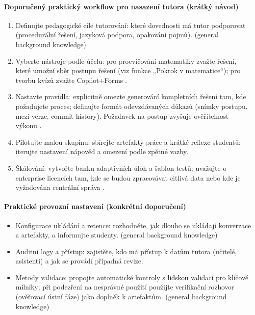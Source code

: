 \paragraph{Doporučený praktický workflow pro nasazení tutora (krátký návod)}
\begin{enumerate}
  \item Definujte pedagogické cíle tutorování: které dovednosti má tutor podporovat (procedurální řešení, jazyková podpora, opakování pojmů). (general background knowledge)
  \item Vyberte nástroje podle účelu: pro procvičování matematiky zvažte řešení, které umožní sběr postupu řešení (viz funkce „Pokrok v matematice“); pro tvorbu kvízů zvažte Copilot+Forms \cite{kb_ai_101_tipu_pdf_04e4a115_page_8_1,kb_ai_101_tipu_pdf_04e4a115_page_36_1}.
  \item Nastavte pravidla: explicitně omezte generování kompletních řešení tam, kde požadujete proces; definujte formát odevzdávaných důkazů (snímky postupu, mezi‑verze, commit‑history). Požadavek na postup zvyšuje ověřitelnost výkonu \cite{kb_ai_101_tipu_pdf_04e4a115_page_8_1}.
  \item Pilotujte malou skupinu: sbírejte artefakty práce a krátké reflexe studentů; iterujte nastavení nápověd a omezení podle zpětné vazby.
  \item Škálování: vytvořte banku adaptivních úloh a šablon testů; uvažujte o enterprise licencích tam, kde se budou zpracovávat citlivá data nebo kde je vyžadována centrální správa \cite{kb_ai_101_tipu_pdf_04e4a115_page_36_1}.
\end{enumerate}

\paragraph{Praktické provozní nastavení (konkrétní doporučení)}
\begin{itemize}
  \item Konfigurace ukládání a retence: rozhodněte, jak dlouho se ukládají konverzace a artefakty, a informujte studenty. (general background knowledge)
  \item Auditní logy a přístup: zajistěte, kdo má přístup k datům tutora (učitelé, asistenti) a jak se provádí případná revize.
  \item Metody validace: propojte automatické kontroly s lidskou validací pro klíčové milníky; při podezření na nesprávné použití použijte verifikační rozhovor (ověřovací ústní fáze) jako doplněk k artefaktům. (general background knowledge)
\end{itemize}

